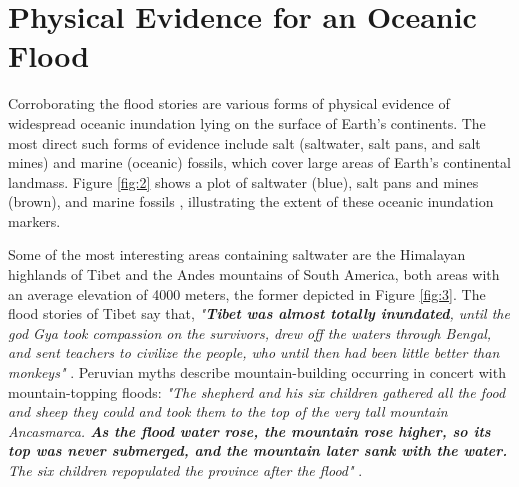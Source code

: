 \documentclass[10pt,twocolumn,letterpaper]{article}
\begin{document}
\section{Physical Evidence for an Oceanic Flood}

Corroborating the flood stories are various forms of physical evidence of widespread oceanic inundation lying on the surface of Earth's continents. The most direct such forms of evidence include salt (saltwater, salt pans, and salt mines) and marine (oceanic) fossils, which cover large areas of Earth's continental landmass. Figure \ref{fig:2} shows a plot of saltwater (blue), salt pans and mines (brown), and marine fossils \cite{15,16,86,87}, illustrating the extent of these oceanic inundation markers.


Some of the most interesting areas containing saltwater are the Himalayan highlands of Tibet and the Andes mountains of South America, both areas with an average elevation of 4000 meters, the former depicted in Figure \ref{fig:3}. The flood stories of Tibet say that, \textit{"\textbf{Tibet was almost totally inundated}, until the god Gya took compassion on the survivors, drew off the waters through Bengal, and sent teachers to civilize the people, who until then had been little better than monkeys"} \cite{3}. Peruvian myths describe mountain-building occurring in concert with mountain-topping floods: \textit{"The shepherd and his six children gathered all the food and sheep they could and took them to the top of the very tall mountain Ancasmarca. \textbf{As the flood water rose, the mountain rose higher, so its top was never submerged, and the mountain later sank with the water.} The six children repopulated the province after the flood"} \cite{3}.
\end{document}
